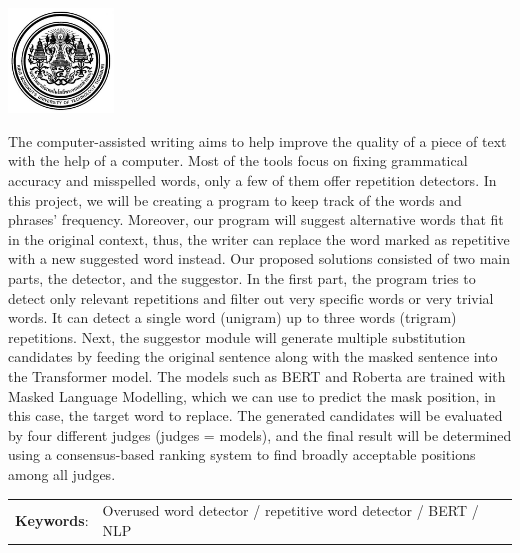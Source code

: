 \documentclass[12pt,oneside,openright,a4paper]{cpe-english-project}
\begin{document}
\pdfstringdefDisableCommands{%
\let\MakeUppercase\relax
}
\begin{center}
  \includegraphics[width=2.8cm]{logo02.jpg}
\end{center}
\vspace*{-1cm}

\maketitlepage
\makesignaturepage 

\abstract

The computer-assisted writing aims to help improve the quality of a piece of text with the help of a computer. Most of the tools focus on fixing grammatical accuracy and misspelled words, only a few of them offer repetition detectors. In this project, we will be creating a program to keep track of the words and phrases' frequency. Moreover, our program will suggest alternative words that fit in the original context, thus, the writer can replace the word marked as repetitive with a new suggested word instead. Our proposed solutions consisted of two main parts, the detector, and the suggestor. In the first part, the program tries to detect only relevant repetitions and filter out very specific words or very trivial words. It can detect a single word (unigram) up to three words (trigram) repetitions. Next, the suggestor module will generate multiple substitution candidates by feeding the original sentence along with the masked sentence into the Transformer model. The models such as BERT and Roberta are trained with Masked Language Modelling, which we can use to predict the mask position, in this case, the target word to replace. The generated candidates will be evaluated by four different judges (judges = models), and the final result will be determined using a consensus-based ranking system to find broadly acceptable positions among all judges.

\begin{flushleft}
\begin{tabular*}{\textwidth}{@{}lp{}}
\textbf{Keywords}: & Overused word detector / repetitive word detector / BERT / NLP
\end{tabular*}
\end{flushleft}
\endabstract
\end{document}
